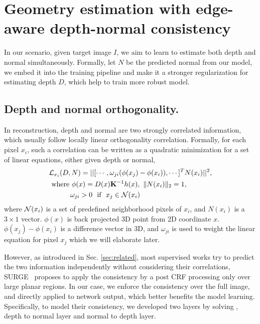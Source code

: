 \vspace{-0.7\baselineskip}
\section{Geometry estimation with edge-aware depth-normal consistency}
\label{sec:approach}
\vspace{-0.3\baselineskip}

In our scenario, given target image $I$, we aim to learn to estimate both depth and normal simultaneously. Formally, let $N$ be the predicted normal from our model, we embed it into the training pipeline and make it a stronger regularization for estimating depth $D$, which help to train more robust model.

\vspace{-0.5\baselineskip}
\subsection{Depth and normal orthogonality.}
\label{sub:depth_and_normal_orthogonality}
\vspace{-0.3\baselineskip}

In reconstruction, depth and normal are two strongly correlated information, which usually follow locally linear orthogonality correlation. Formally, for each pixel $x_i$, such a correlation can be written as a quadratic minimization for a set of linear equations, either given depth or normal,
\begin{align}
\label{eq:orthognal}
&{\mathcal L}_{x_i}(D, N) = ||[\cdots,\omega_{ji}(\phi(x_j) - \phi(x_i)), \cdots]^T  N(x_i)||^2, \nonumber \\
&~\text{where~} \phi(x) = D(x){\mathbf K}^{-1}h(x), \text{~} \|N(x_i)\|_2 = 1, \nonumber\\
&~\text{~~~~~~~~} \omega_{ji} > 0 \text{~~if~~} x_j \in {\mathcal N}(x_i)
\end{align}
where ${\mathcal N}(x_i)$ is a set of predefined neighborhood pixels of $x_i$, and $N(x_i)$ is a $3 \times 1$ vector. $\phi(x)$ is back projected 3D point from 2D coordinate $x$. $\phi(x_j) - \phi(x_i)$ is a difference vector in 3D, and $\omega_{ji}$ is used to weight the linear equation for pixel $x_j$ which we will elaborate later.

However, as introduced in Sec. \ref{sec:related}, most supervised works try to predict the two information independently without considering their correlations, SURGE~\cite{peng2016depth} proposes to apply the consistency by a post CRF processing only over large planar regions. In our case, we enforce the consistency over the full image, and directly applied to network output, which better benefits the model learning. Specifically, to model their consistency, we developed two layers by solving , \ie depth to normal layer and normal to depth layer. 

